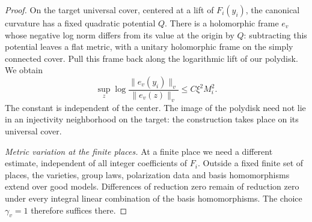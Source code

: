 \begin{proof}
On the target universal cover, centered at a lift of $F_i(y_i)$,
the canonical curvature has a fixed quadratic potential $Q$.
There is a holomorphic frame $e_v$ whose negative log norm differs
from its value at the origin by $Q$: subtracting this potential
leaves a flat metric, with a unitary holomorphic frame on the simply
connected cover.  Pull this frame back along the logarithmic lift
of our polydisk.  We obtain
\begin{equation}\label{eq:index-infinite-metric}
 \sup_z\log\frac{\|e_v(y_i)\|_v}{\|e_v(z)\|_v}
 \le C\xi^2M_i^2.
\end{equation}
The constant is independent of the center.  The image of the polydisk
need not lie in an injectivity neighborhood on the target: the
construction takes place on its universal cover.

\emph{Metric variation at the finite places.}
At a finite place we need a different estimate, independent of all
integer coefficients of $F_i$.  Outside a fixed finite set of places,
the varieties, group laws, polarization data and basis homomorphisms
extend over good models.  Differences of reduction zero remain of
reduction zero under every integral linear combination of the basis
homomorphisms.  The choice $\gamma_v=1$ therefore suffices there.


\end{proof}
